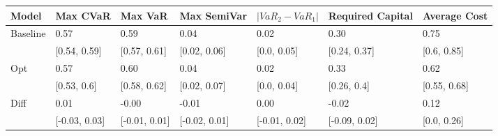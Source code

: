 \begin{tabular}{lllllll}
\toprule
   Model &      Max CVaR &       Max VaR &   Max SemiVar & $|VaR_2 - VaR_1|$ & Required Capital & Average Cost \\
\midrule
Baseline &          0.57 &          0.59 &          0.04 &              0.02 &             0.30 &         0.75 \\
         &  [0.54, 0.59] &  [0.57, 0.61] &  [0.02, 0.06] &       [0.0, 0.05] &     [0.24, 0.37] &  [0.6, 0.85] \\
     Opt &          0.57 &          0.60 &          0.04 &              0.02 &             0.33 &         0.62 \\
         &   [0.53, 0.6] &  [0.58, 0.62] &  [0.02, 0.07] &       [0.0, 0.04] &      [0.26, 0.4] & [0.55, 0.68] \\
    Diff &          0.01 &         -0.00 &         -0.01 &              0.00 &            -0.02 &         0.12 \\
         & [-0.03, 0.03] & [-0.01, 0.01] & [-0.02, 0.01] &     [-0.01, 0.02] &    [-0.09, 0.02] &  [0.0, 0.26] \\
\bottomrule
\end{tabular}
